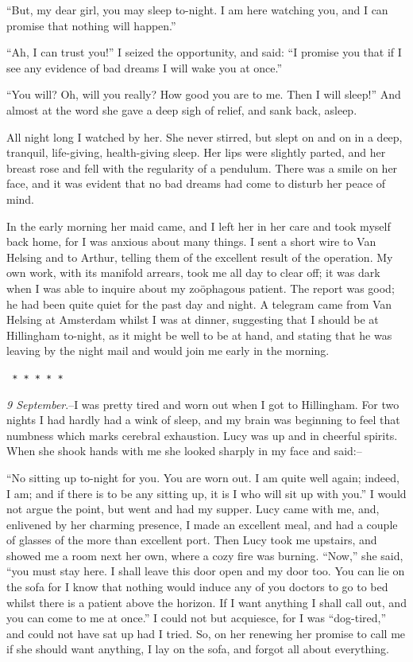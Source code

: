 \documentclass[12pt,openright]{book}
\begin{document}
“But, my dear girl, you may sleep to-night. I am here watching you, and I can promise that nothing will happen.”

“Ah, I can trust you!” I seized the opportunity, and said: “I promise you that if I see any evidence of bad dreams I will wake you at once.”

“You will? Oh, will you really? How good you are to me. Then I will sleep!” And almost at the word she gave a deep sigh of relief, and sank back, asleep.

All night long I watched by her. She never stirred, but slept on and on in a deep, tranquil, life-giving, health-giving sleep. Her lips were slightly parted, and her breast rose and fell with the regularity of a pendulum. There was a smile on her face, and it was evident that no bad dreams had come to disturb her peace of mind.

In the early morning her maid came, and I left her in her care and took myself back home, for I was anxious about many things. I sent a short wire to Van Helsing and to Arthur, telling them of the excellent result of the operation. My own work, with its manifold arrears, took me all day to clear off; it was dark when I was able to inquire about my zoöphagous patient. The report was good; he had been quite quiet for the past day and night. A telegram came from Van Helsing at Amsterdam whilst I was at dinner, suggesting that I should be at Hillingham to-night, as it might be well to be at hand, and stating that he was leaving by the night mail and would join me early in the morning.

\texttt{   *       *       *       *       *}

\textit{9 September}.–I was pretty tired and worn out when I got to Hillingham. For two nights I had hardly had a wink of sleep, and my brain was beginning to feel that numbness which marks cerebral exhaustion. Lucy was up and in cheerful spirits. When she shook hands with me she looked sharply in my face and said:–

“No sitting up to-night for you. You are worn out. I am quite well again; indeed, I am; and if there is to be any sitting up, it is I who will sit up with you.” I would not argue the point, but went and had my supper. Lucy came with me, and, enlivened by her charming presence, I made an excellent meal, and had a couple of glasses of the more than excellent port. Then Lucy took me upstairs, and showed me a room next her own, where a cozy fire was burning. “Now,” she said, “you must stay here. I shall leave this door open and my door too. You can lie on the sofa for I know that nothing would induce any of you doctors to go to bed whilst there is a patient above the horizon. If I want anything I shall call out, and you can come to me at once.” I could not but acquiesce, for I was “dog-tired,” and could not have sat up had I tried. So, on her renewing her promise to call me if she should want anything, I lay on the sofa, and forgot all about everything.
\end{document}
